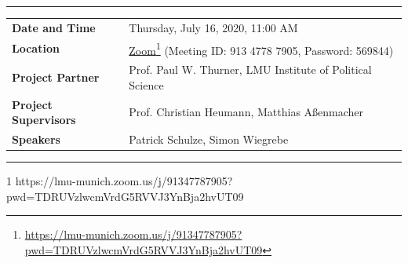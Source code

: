 \documentclass[12pt,reqno]{article}
\begin{document}
\begin{titlepage}
\vspace{-0.2cm}
\noindent
\rule{\textwidth}{1.5pt}
\begin{table}[htb!]
\setlength{\tabcolsep}{1mm}
\begin{center}
\begin{tabular}{l l}
\textbf{Date and Time} & Thursday, July 16, 2020, 11:00 AM  \\
\textbf{Location} & \href{https://lmu-munich.zoom.us/j/91347787905?pwd=TDRUVzlwcmVrdG5RVVJ3YnBja2hvUT09}{Zoom}\footnote{\url{https://lmu-munich.zoom.us/j/91347787905?pwd=TDRUVzlwcmVrdG5RVVJ3YnBja2hvUT09}} (Meeting ID: 913 4778 7905, Password: 569844) \\
\textbf{Project Partner} & Prof. Paul W. Thurner, LMU Institute of Political Science \\
\textbf{Project Supervisors} & Prof. Christian Heumann, Matthias Aßenmacher \\

\textbf{Speakers} & Patrick Schulze, Simon Wiegrebe
 
 
\end{tabular}
\end{center}
\vspace{-0.2cm}
\rule{\textwidth}{1.5pt}
\footnotesize 1 https://lmu-munich.zoom.us/j/91347787905?pwd=TDRUVzlwcmVrdG5RVVJ3YnBja2hvUT09
\end{table}

\end{titlepage}
\end{document}
